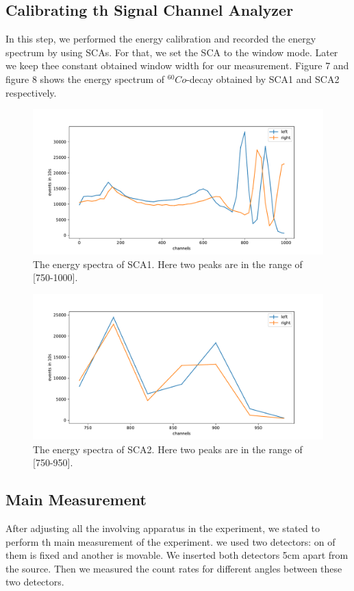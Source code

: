 \subsection{Calibrating th Signal Channel Analyzer}
In this step, we performed the energy calibration and recorded the energy spectrum by using SCAs. For that, we set the SCA to the window mode. Later  we keep thee constant obtained window width for our measurement. Figure 7 and figure 8 shows the energy spectrum of $ ^{60}Co$-decay obtained by SCA1 and SCA2 respectively.
\begin{figure}[ht]
	\centering
	\includegraphics[width=0.8\linewidth]{./figs/sca.pdf}
	\caption{The energy spectra of SCA1. Here two peaks are in the range of [750-1000].}%
	\label{fig:angAsymm}
\end{figure}

\begin{figure}[ht]
	\centering
	\includegraphics[width=0.8\linewidth]{./figs/sca2.pdf}
	\caption{The energy spectra of SCA2. Here two peaks are in the range of [750-950].}%
	\label{fig:angAsymm}
\end{figure}


\subsection{Main Measurement}
After adjusting all the involving apparatus in the experiment, we stated to perform th main measurement of the experiment. we used two detectors: on of them is fixed and another is movable. We inserted both detectors 5cm apart from the source. Then we measured the count rates for different angles between these two detectors.

